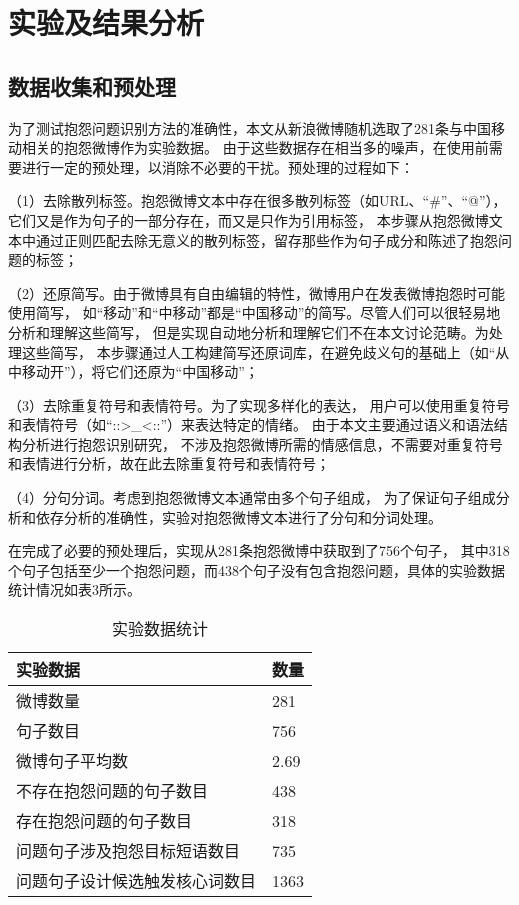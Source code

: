 \section{实验及结果分析}\label{sec:1.4}
\subsection{数据收集和预处理}\label{subsection:1.3.4}

为了测试抱怨问题识别方法的准确性，本文从新浪微博随机选取了281条与中国移动相关的抱怨微博作为实验数据。
由于这些数据存在相当多的噪声，在使用前需要进行一定的预处理，以消除不必要的干扰。预处理的过程如下：

（1）去除散列标签。抱怨微博文本中存在很多散列标签（如URL、“\#”、“@”），
它们又是作为句子的一部分存在，而又是只作为引用标签，
本步骤从抱怨微博文本中通过正则匹配去除无意义的散列标签，留存那些作为句子成分和陈述了抱怨问题的标签；

（2）还原简写。由于微博具有自由编辑的特性，微博用户在发表微博抱怨时可能使用简写，
如“移动”和“中移动”都是“中国移动”的简写。尽管人们可以很轻易地分析和理解这些简写，
但是实现自动地分析和理解它们不在本文讨论范畴。为处理这些简写，
本步骤通过人工构建简写还原词库，在避免歧义句的基础上（如“从中移动开”），将它们还原为“中国移动”；

（3）去除重复符号和表情符号。为了实现多样化的表达，
用户可以使用重复符号和表情符号（如“::>\_<::”）来表达特定的情绪。
由于本文主要通过语义和语法结构分析进行抱怨识别研究，
不涉及抱怨微博所需的情感信息，不需要对重复符号和表情进行分析，故在此去除重复符号和表情符号；

（4）分句分词。考虑到抱怨微博文本通常由多个句子组成，
为了保证句子组成分析和依存分析的准确性，实验对抱怨微博文本进行了分句和分词处理。

在完成了必要的预处理后，实现从281条抱怨微博中获取到了756个句子，
其中318个句子包括至少一个抱怨问题，而438个句子没有包含抱怨问题，具体的实验数据统计情况如表3所示。
\begin{table}[ht]
    \centering
    \caption{实验数据统计}\label{tab:1.3}
    \vskip -10pt
    \begin{tabularx}{\textwidth}{XY}
    \toprule
    实验数据 & 数量 \\
    \midrule
    微博数量 & 281 \\
    句子数目 & 756 \\
    微博句子平均数 & 2.69 \\
    不存在抱怨问题的句子数目 & 438 \\
    存在抱怨问题的句子数目 & 318 \\
    问题句子涉及抱怨目标短语数目 & 735 \\
    问题句子设计候选触发核心词数目 & 1363 \\
    \bottomrule
    \end{tabularx}
\end{table}

